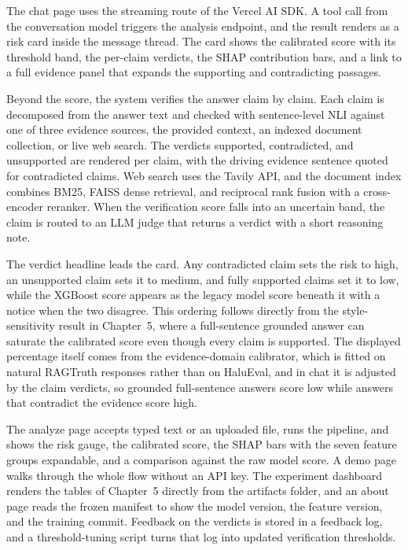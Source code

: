 The chat page uses the streaming route of the Vercel AI SDK. A tool call from the conversation model triggers the analysis endpoint, and the result renders as a risk card inside the message thread. The card shows the calibrated score with its threshold band, the per-claim verdicts, the SHAP contribution bars, and a link to a full evidence panel that expands the supporting and contradicting passages.

Beyond the score, the system verifies the answer claim by claim. Each claim is decomposed from the answer text and checked with sentence-level NLI against one of three evidence sources, the provided context, an indexed document collection, or live web search. The verdicts supported, contradicted, and unsupported are rendered per claim, with the driving evidence sentence quoted for contradicted claims. Web search uses the Tavily API, and the document index combines BM25, FAISS dense retrieval, and reciprocal rank fusion with a cross-encoder reranker. When the verification score falls into an uncertain band, the claim is routed to an LLM judge that returns a verdict with a short reasoning note.

The verdict headline leads the card. Any contradicted claim sets the risk to high, an unsupported claim sets it to medium, and fully supported claims set it to low, while the XGBoost score appears as the legacy model score beneath it with a notice when the two disagree. This ordering follows directly from the style-sensitivity result in Chapter~5, where a full-sentence grounded answer can saturate the calibrated score even though every claim is supported. The displayed percentage itself comes from the evidence-domain calibrator, which is fitted on natural RAGTruth responses rather than on HaluEval, and in chat it is adjusted by the claim verdicts, so grounded full-sentence answers score low while answers that contradict the evidence score high.

The analyze page accepts typed text or an uploaded file, runs the pipeline, and shows the risk gauge, the calibrated score, the SHAP bars with the seven feature groups expandable, and a comparison against the raw model score. A demo page walks through the whole flow without an API key. The experiment dashboard renders the tables of Chapter~5 directly from the artifacts folder, and an about page reads the frozen manifest to show the model version, the feature version, and the training commit. Feedback on the verdicts is stored in a feedback log, and a threshold-tuning script turns that log into updated verification thresholds.

